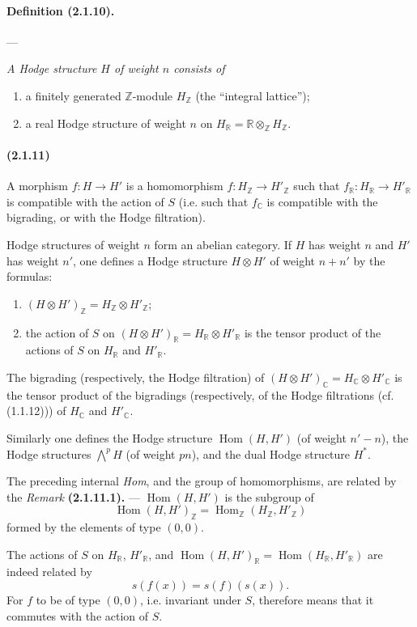 \documentclass[10pt]{article}
\newcommand{\C}{\mathbb C}
\newcommand{\Z}{\mathbb Z}
\newcommand{\Hom}{\operatorname{Hom}}
\newcommand{\R}{\mathbb R}
\begin{document}
\paragraph{Definition (2.1.10).} --- {\itshape A Hodge structure $H$ of weight $n$ consists of
\begin{enumerate}[label=\alph*)]
\item a finitely generated $\Z$-module $H_\Z$ (the ``integral lattice'');
\item a real Hodge structure of weight $n$ on $H_\R=\R\otimes_\Z H_\Z$.
\end{enumerate}}

\paragraph{(2.1.11)} A morphism $f:H\to H'$ is a homomorphism $f:H_\Z\to H'_\Z$ such that $f_\R:H_\R\to H'_\R$ is compatible with the action of $S$ (i.e. such that $f_\C$ is compatible with the bigrading, or with the Hodge filtration).

Hodge structures of weight $n$ form an abelian category. If $H$ has weight $n$ and $H'$ has weight $n'$, one defines a Hodge structure $H\otimes H'$ of weight $n+n'$ by the formulas:
\begin{enumerate}[label=\alph*)]
\item $(H\otimes H')_\Z=H_\Z\otimes H'_\Z$;
\item the action of $S$ on $(H\otimes H')_\R=H_\R\otimes H'_\R$ is the tensor product of the actions of $S$ on $H_\R$ and $H'_\R$.
\end{enumerate}
The bigrading (respectively, the Hodge filtration) of $(H\otimes H')_\C=H_\C\otimes H'_\C$ is the tensor product of the bigradings (respectively, of the Hodge filtrations (cf. (1.1.12))) of $H_\C$ and $H'_\C$.

Similarly one defines the Hodge structure $\Hom(H,H')$ (of weight $n'-n$), the Hodge structures $\bigwedge^pH$ (of weight $pn$), and the dual Hodge structure $H^*$.

The preceding internal \emph{Hom}, and the group of homomorphisms, are related by the \emph{Remark} \textbf{(2.1.11.1).} --- $\Hom(H,H')$ is the subgroup of
\[
\Hom(H,H')_\Z=\Hom_\Z(H_\Z,H'_\Z)
\]
formed by the elements of type $(0,0)$.

The actions of $S$ on $H_\R$, $H'_\R$, and $\Hom(H,H')_\R=\Hom(H_\R,H'_\R)$ are indeed related by
\[
s(f(x))=s(f)(s(x)).
\]
For $f$ to be of type $(0,0)$, i.e. invariant under $S$, therefore means that it commutes with the action of $S$.
\end{document}
